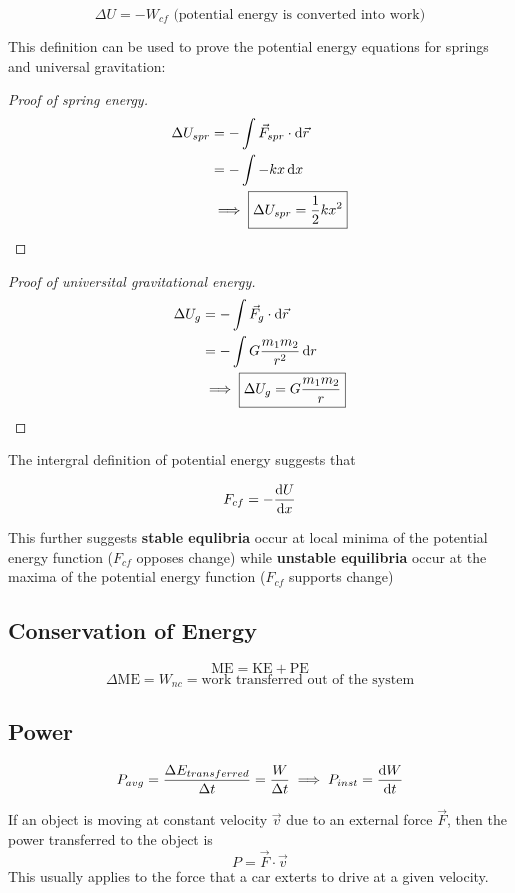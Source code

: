 \documentclass{article}
\begin{document}
\[\Delta U = -W_{cf} \textrm{ (potential energy is converted into work)}\]

This definition can be used to prove the potential energy equations for springs and universal gravitation:

\begin{proof}[Proof of spring energy]
    \begin{align*}
        \Delta U_{spr} &= -\int \vec{F}_{spr} \cdot \odif{\vec{r}} \\
        &= - \int -kx \odif{x} \\
        &\implies \boxed{\Delta U_{spr} = \frac{1}{2} kx^2}
    \end{align*}
\end{proof}
\begin{proof}[Proof of universital gravitational energy]
    \begin{align*}
        \Delta U_{g} &= -\int \vec{F}_g \cdot \odif{\vec{r}} \\
        &= - \int G \frac{m_1 m_2}{r^2} \odif{r} \\
        &\implies \boxed{\Delta U_g = G\frac{m_1 m_2}{r}}
    \end{align*}
\end{proof}

The intergral definition of potential energy suggests that

\[F_{cf} = -\odv{U}{x}\]

This further suggests \textbf{stable equlibria} occur at local minima of the potential energy function ($F_{cf}$ opposes change) while \textbf{unstable equilibria} occur at the maxima of the potential energy function ($F_{cf}$ supports change)

\subsection{Conservation of Energy}
\[\textrm{ME} = \textrm{KE} + \textrm{PE}\]
\[\Delta \textrm{ME} = W_{nc} = \textrm{work transferred out of the system}\]

\subsection{Power}
\[P_{avg} = \frac{\Delta E_{transferred}}{\Delta t} = \frac{W}{\Delta t} \implies P_{inst} = \odv{W}{t}\]

If an object is moving at constant velocity $\vec{v}$ due to an external force $\vec{F}$, then the power transferred to the object is
\[P = \vec{F} \cdot \vec{v}\] 
This usually applies to the force that a car exterts to drive at a given velocity.
\end{document}
